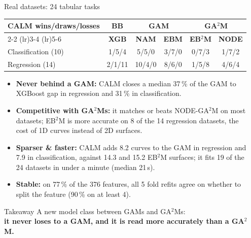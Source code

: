 \documentclass[final]{beamer}
\newcommand{\gamm}{GA$^2$M}
\newcommand{\gamms}{GA$^2$Ms}
\newlength{\sepwidth}
\newlength{\colwidth}
\newcommand{\separatorcolumn}{\begin{column}{\sepwidth}\end{column}}
\begin{document}
\begin{frame}[t,fragile]
\begin{columns}[t]
\begin{column}{\colwidth}
\begin{block}{Real datasets: 24 tabular tasks}
        \smallskip
        \begin{center}
        \setlength{\tabcolsep}{12pt}
        \begin{tabular}{lccccc}
          \toprule
          \textbf{CALM wins/draws/losses} & \textbf{BB} & \multicolumn{2}{c}{\textbf{GAM}} & \multicolumn{2}{c}{\textbf{GA$^2$M}} \\
          \cmidrule(lr){2-2} \cmidrule(lr){3-4} \cmidrule(lr){5-6}
          & \textbf{XGB} & \textbf{NAM} & \textbf{EBM} & \textbf{EB$^2$M} & \textbf{NODE} \\
          \midrule
          Classification (10) & 1/5/4  & 5/5/0  & 3/7/0 & 0/7/3 & 1/7/2 \\
          Regression (14)     & 2/1/11 & 10/4/0 & 8/6/0 & 1/5/8 & 4/6/4 \\
          \bottomrule
        \end{tabular}
        \end{center}

        \begin{itemize}
          \item \textbf{Never behind a GAM:} CALM closes a median 37\,\% of the GAM to XGBoost
            gap in regression and 31\,\% in classification.
          \item \textbf{Competitive with \gamms:} it matches or beats NODE-GA$^2$M on most
            datasets; EB$^2$M is more accurate on 8 of the 14 regression datasets, the cost of
            1D curves instead of 2D surfaces.
          \item \textbf{Sparser \& faster:} CALM adds 8.2 curves to the GAM in regression and 7.9
            in classification, against 14.3 and 15.2 EB$^2$M surfaces; it fits 19 of the 24
            datasets in under a minute (median 21\,s).
          \item \textbf{Stable:} on 77\,\% of the 376 features, all 5 fold refits agree on whether
            to split the feature (90\,\% on at least 4).
        \end{itemize}
      \end{block}

      \begin{alertblock}{Takeaway}
        \Centering
        \large{A new model class between GAMs and \gamms:\\
        \textbf{it never loses to a GAM, and it is read more accurately than a \gamm.}}
      \end{alertblock}

    \end{column}
    \separatorcolumn
  \end{columns}

\end{frame}
\end{document}
